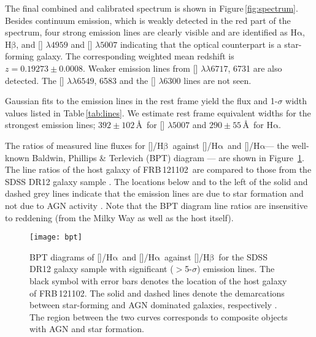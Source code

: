 \documentclass[twocolumn]{aastex61}
\def \frb {FRB\,121102}
\def \halpha {\ensuremath{\mathrm{H\alpha}}}
\def \hbeta {\ensuremath{\mathrm{H\beta}}}
\begin{document}
The final combined and calibrated spectrum is shown in Figure\,\ref{fig:spectrum}. Besides continuum emission, which is
weakly detected in the red part of the spectrum, four strong emission
lines are clearly visible and are identified as \halpha, \hbeta,
and [] $\lambda4959$ and [] $\lambda5007$ indicating that the optical counterpart is a star-forming galaxy. The corresponding weighted mean redshift is $z=0.19273\pm0.0008$. Weaker emission lines from [] $\lambda\lambda6717$, 6731 are also
detected. The [] $\lambda\lambda6549$, 6583 and the
[] $\lambda6300$ lines are not seen.

Gaussian fits to the emission lines in the rest frame yield the flux
and 1-$\sigma$ width values listed in Table\,\ref{tab:lines}. We estimate rest frame equivalent widths for the strongest emission lines; $392\pm102$\,\AA\ for [] $\lambda5007$ and $290\pm55$\,\AA\ for \halpha.


The ratios of measured line fluxes for []/\hbeta\ against
[]/\halpha\ and []/\halpha --- the well-known Baldwin, Phillips \& Terlevich (BPT) diagram \citep{bpt81} --- are shown in Figure~\ref{fig:bpt}. The line ratios of the host galaxy of \frb\ are compared to those from the SDSS
DR12 galaxy sample \citep{aaa+15}. The locations below and to the left of the
solid and dashed grey lines indicate that the emission lines are due
to star formation and not due to AGN activity \citep{kds+01,kgkh06,kht+03}. Note that the BPT diagram line ratios are insensitive to reddening (from the Milky Way as well as the host itself).

\begin{figure}
  \texttt{[image: bpt]}
  \caption{BPT \citep{bpt81} diagrams of []/\halpha\ and
    []/\halpha\ against []/\hbeta\ for the SDSS
    DR12 \citep{aaa+15} galaxy sample with significant ($>$5-$\sigma$)
    emission lines. The black symbol with error bars denotes the
    location of the host galaxy of FRB\,121102. The solid and dashed
    lines denote the demarcations between star-forming and AGN dominated
    galaxies, respectively \citep{kds+01,kgkh06,kht+03}. The region between the two curves corresponds to composite objects with AGN and star formation.}
  \label{fig:bpt}
\end{figure}
\end{document}
